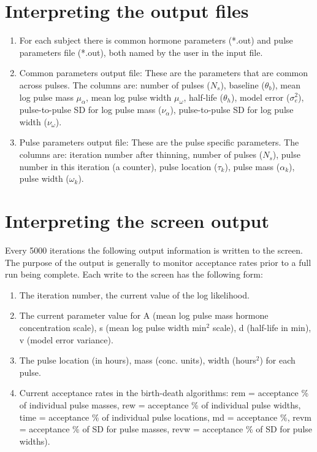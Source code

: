 \documentclass[12pt, oneside]{article}   	%
\begin{document}
\section{Interpreting the output files}
\begin{enumerate}
\item For each subject there is common hormone parameters (*.out) and pulse parameters file (*.out), both named by the user in the input file. 
\item Common parameters output file: These are the parameters that are common across pulses.  The columns are: number of pulses ($N_s$), baseline ($\theta_b$), mean log pulse mass $\mu_{\alpha}$, mean log pulse width $\mu_{\omega}$, half-life ($\theta_h$), model error ($\sigma^2_{e}$), pulse-to-pulse SD for log pulse mass ($\nu_\alpha$), pulse-to-pulse SD for log pulse width ($\nu_\omega$).
\item Pulse parameters output file: These are the pulse specific parameters. The columns are:  iteration number after thinning, number of pulses ($N_s$), pulse number in this iteration (a counter), pulse location ($\tau_k$), pulse mass ($\alpha_k$), pulse width ($\omega_k$).
\end{enumerate}

\section{Interpreting the screen output}
Every 5000 iterations the following output information is written to the screen. The purpose of the output is generally to monitor acceptance rates prior to a full run being complete.  Each write to the screen has the following form:
\begin{enumerate}
\item The iteration number, the current value of the log likelihood.
\item The current parameter value for A (mean log pulse mass hormone concentration scale), s (mean log pulse width min$^2$ scale),  d (half-life in min), v (model error variance).
\item The pulse location (in hours), mass (conc. units), width (hours$^2$) for each pulse.
\item Current acceptance rates in the birth-death algorithms: rem = acceptance \% of individual pulse masses, rew = acceptance \% of individual pulse widths, time = acceptance \% of individual pulse locations, md = acceptance \%, revm = acceptance \% of SD for pulse masses, revw = acceptance \% of SD for pulse widths).
\end{enumerate}
\end{document}
